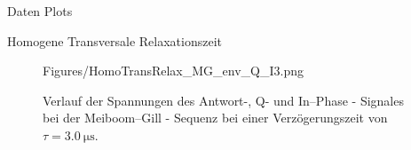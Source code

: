 \begin{appendix}
\begin{chapter}{Daten Plots}
\begin{section}{Homogene Transversale Relaxationszeit}
\begin{subsection}
\begin{figure}[htb!]
\begin{minipage}{.48\textwidth}
            {Figures/HomoTransRelax_MG_env_Q_I3.png}
            \caption{Verlauf der Spannungen des Antwort-, Q- und
              In--Phase - Signales bei der Meiboom--Gill - Sequenz
              bei einer Verzögerungszeit von $\tau = \SI{3.0}{\micro\second}$.}
            \label{AnhangfigMG_envQI3}
          \end{minipage}
        \end{figure}
        
      \end{subsection}
      
    \end{section}
    
  \end{chapter}
  
\end{appendix}
 